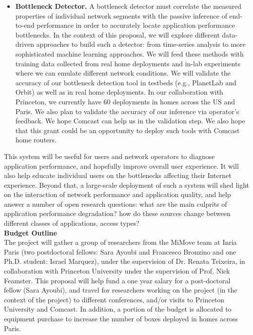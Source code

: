 \documentclass[11 pt]{article}
\begin{document}
\begin{itemize}
\item \textbf{Bottleneck Detector.} A bottleneck detector must correlate the measured properties of individual network segments with the passive inference of end-to-end performance in order to accurately locate application performance bottlenecks. In the context of this proposal, we will explore different data-driven approaches to build such a detector: from time-series analysis to more sophisticated machine learning approaches. We will feed these methods with training data collected from real home deployments and in-lab experiments where we can emulate different network conditions. We will validate the accuracy of our bottleneck detection tool in testbeds (e.g., PlanetLab and Orbit) as well as in real home deployments. In our collaboration with Princeton, we currently have 60 deployments in homes across the US and Paris. We also plan to validate the accuracy of our inference via operator's feedback. We hope Comcast can help us in the validation step. We also hope that this grant could be an opportunity to deploy such tools with Comcast home routers.
\end{itemize}

This system will be useful for users and network operators to diagnose application performance, and hopefully improve overall user experience. It will also help educate individual users on the bottlenecks affecting their Internet experience. Beyond that, a large-scale deployment of such a system will shed light on the interaction of network performance and application quality, and help answer a number of open research questions: what are the main culprits of application performance degradation? how do these sources change between different classes of applications, access types?\\

\noindent \textbf{Budget Outline}\\

The project will gather a group of researchers from the MiMove team at Inria Paris (two postdoctoral fellows: Sara Ayoubi and Francesco Bronzino and one Ph.D. student: Israel Marquez), under the supervision of Dr. Renata Teixeira, in collaboration with Princeton University under the supervision of Prof. Nick Feamster. This proposal will help fund a one year salary for a post-doctoral fellow (Sara Ayoubi), and travel for researchers working on the project (in the context of the project) to different conferences, and/or visits to Princeton University and Comcast. In addition, a portion of the budget is allocated to equipment purchase to increase the number of boxes deployed in homes across Paris.\\
\end{document}
